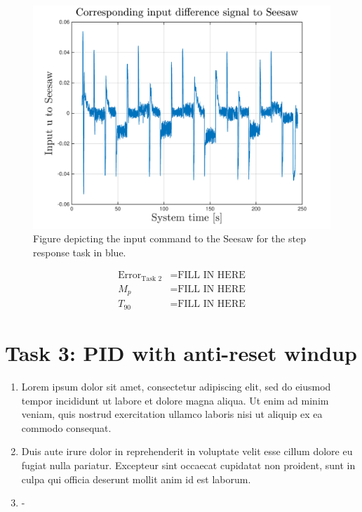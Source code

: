 \documentclass[12pt,a4paper,twocolumn]{article}
\begin{document}
\begin{figure}[ht]
\centering
\includegraphics[width=.95\linewidth]{figures/seesaw_measurement_task2_fig2}
\caption[Measure1]{\label{f:measure1} Figure depicting the input command to the Seesaw for the step response task in blue.}
\label{fig:seesaw_task2_fig2}
\end{figure}


\begin{align*}
\text{Error}_{\text{Task 2}} &= \text{FILL IN HERE} \\
M_p & = \text{FILL IN HERE} \\
T_{90} &= \text{FILL IN HERE} 
\end{align*}

\section*{Task 3: PID with anti-reset windup}
\label{s:task_3}


\begin{enumerate}[label=\alph*)]
\item Lorem ipsum dolor sit amet, consectetur adipiscing elit, sed do eiusmod tempor incididunt ut labore et dolore magna aliqua. Ut enim ad minim veniam, quis nostrud exercitation ullamco laboris nisi ut aliquip ex ea commodo consequat. 

\item Duis aute irure dolor in reprehenderit in voluptate velit esse cillum dolore eu fugiat nulla pariatur. Excepteur sint occaecat cupidatat non proident, sunt in culpa qui officia deserunt mollit anim id est laborum.

\item -
\end{enumerate}
\end{document}
